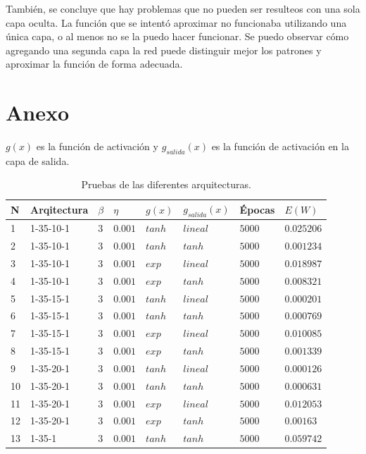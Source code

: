 \documentclass[11pt,a4paper]{article}
\begin{document}
También, se concluye que hay problemas que no pueden ser resulteos con una sola capa oculta. La función que se intentó aproximar no funcionaba utilizando una única capa, o al menos no se la puedo hacer funcionar. Se puedo observar cómo agregando una segunda capa la red puede distinguir mejor los patrones y aproximar la función de forma adecuada.
 
\clearpage	
\appendix
\renewcommand{\figurename}{Figura}
\section{Anexo}

$g(x)$ es la función de activación y $g_{salida}(x)$ es la función de activación en la capa de salida.

{\begin{table}[ht]
\centering
\begin{tabular}{|l|l|l|l|l|l|l|l|}
\hline
N  & Arqitectura & $\beta$ & $\eta$   & $g(x)$ & $g_{salida}(x)$ & Épocas & $E(W)$     \\ \hline
1  & 1-35-10-1    & $3$   & $0.001$ & $tanh$ & $lineal$      & $5000$   & $0.025206$ \\ \hline
2  & 1-35-10-1    & $3$    & $0.001$ & $tanh$ & $tanh$        & $5000$  & $0.001234$ \\ \hline
3  & 1-35-10-1    & $3$   & $0.001$ & $exp$  & $lineal$      & $5000$   & $0.018987$ \\ \hline
4  & 1-35-10-1    & $3$    & $0.001$ & $exp$  & $tanh$        & $5000$   & $0.008321$ \\ \hline
5  & 1-35-15-1    & $3$    & $0.001$ & $tanh$ & $lineal$      & $5000$   & $0.000201$ \\ \hline
6  & 1-35-15-1    & $3$    & $0.001$ & $tanh$ & $tanh$        & $5000$   & $0.000769$ \\ \hline
7  & 1-35-15-1    & $3$   & $0.001$ & $exp$  & $lineal$      & $5000$   & $0.010085$ \\ \hline
8  & 1-35-15-1    & $3$    & $0.001$ & $exp$  & $tanh$        & $5000$   & $0.001339$ \\ \hline
9  & 1-35-20-1    & $3$    & $0.001$ & $tanh$ & $lineal$      & $5000$   & $0.000126$ \\ \hline
10 & 1-35-20-1    & $3$   & $0.001$ & $tanh$ & $tanh$        & $5000$   & $0.000631$ \\ \hline
11 & 1-35-20-1    & $3$    & $0.001$ & $exp$  & $lineal$      & $5000$   & $0.012053$ \\ \hline
12 & 1-35-20-1    & $3$    & $0.001$ & $exp$  & $tanh$        & $5000$   & $0.00163$  \\ \hline
13 & 1-35-1    & $3$    & $0.001$ & $tanh$  & $tanh$        & $5000$   & $0.059742$  \\ \hline
\end{tabular}
\caption{Pruebas de las diferentes arquitecturas.}
\label{table:pruebaArqs} 
\end{table}

}
\end{document}
